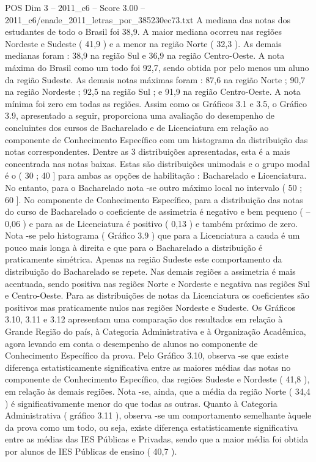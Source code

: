 \begin{textsample}{POS Dim 3 – 2011\_c6 – Score 3.00 – 2011\_c6/enade\_2011\_letras\_por\_385230ec73.txt}
A mediana das notas dos estudantes de todo o Brasil foi 38,9.
A maior mediana ocorreu nas regiões Nordeste e Sudeste ( 41,9 ) e a menor na região Norte ( 32,3 ).
As demais medianas foram : 38,9 na região Sul e 36,9 na região Centro-Oeste.
A nota máxima do Brasil como um todo foi 92,7, sendo obtida por pelo menos um aluno da região Sudeste.
As demais notas máximas foram : 87,6 na região Norte ; 90,7 na região Nordeste ; 92,5 na região Sul ; e 91,9 na região Centro-Oeste.
A nota mínima foi zero em todas as regiões.
Assim como os Gráficos 3.1 e 3.5, o Gráfico 3.9, apresentado a seguir, proporciona uma avaliação do desempenho de concluintes dos cursos de Bacharelado e de Licenciatura em relação ao componente de Conhecimento Específico com um histograma da distribuição das notas correspondentes.
Dentre as 3 distribuições apresentadas, esta é a mais concentrada nas notas baixas.
Estas são distribuições unimodais e o grupo modal é o ( 30 ; 40 ] para ambas as opções de habilitação : Bacharelado e Licenciatura.
No entanto, para o Bacharelado nota -se outro máximo local no intervalo ( 50 ; 60 ].
No componente de Conhecimento Específico, para a distribuição das notas do curso de Bacharelado o coeficiente de assimetria é negativo e bem pequeno ( – 0,06 ) e para as de Licenciatura é positivo ( 0,13 ) e também próximo de zero.
Nota -se pelo histograma ( Gráfico 3.9 ) que para a Licenciatura a cauda é um pouco mais longa à direita e que para o Bacharelado a distribuição é praticamente simétrica.
Apenas na região Sudeste este comportamento da distribuição do Bacharelado se repete.
Nas demais regiões a assimetria é mais acentuada, sendo positiva nas regiões Norte e Nordeste e negativa nas regiões Sul e Centro-Oeste.
Para as distribuições de notas da Licenciatura os coeficientes são positivos mas praticamente nulos nas regiões Nordeste e Sudeste.
Os Gráficos 3.10, 3.11 e 3.12 apresentam uma comparação dos resultados em relação à Grande Região do país, à Categoria Administrativa e à Organização Acadêmica, agora levando em conta o desempenho de alunos no componente de Conhecimento Específico da prova.
Pelo Gráfico 3.10, observa -se que existe diferença estatisticamente significativa entre as maiores médias das notas no componente de Conhecimento Específico, das regiões Sudeste e Nordeste ( 41,8 ), em relação às demais regiões.
Nota -se, ainda, que a média da região Norte ( 34,4 ) é significativamente menor do que todas as outras.
Quanto à Categoria Administrativa ( gráfico 3.11 ), observa -se um comportamento semelhante àquele da prova como um todo, ou seja, existe diferença estatisticamente significativa entre as médias das IES Públicas e Privadas, sendo que a maior média foi obtida por alunos de IES Públicas de ensino ( 40,7 ).

\end{textsample}

